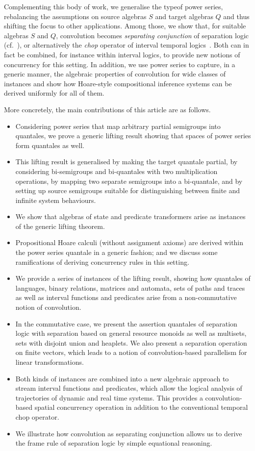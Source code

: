 \documentclass[12pt]{article}
\theoremstyle{definition}
\begin{document}
Complementing this body of work, we generalise the typeof power
series, rebalancing the assumptions on source algebras $S$ and target
algebras $Q$ and thus shifting the focus to other applications.  Among
those, we show that, for suitable algebras $S$ and $Q$, convolution
becomes \emph{separating conjunction} of separation logic
(cf.~\cite{COY07}), or alternatively the \emph{chop} operator of
interval temporal logics~\cite{Mos00}. Both can in fact be combined,
for instance within interval logics, to provide new notions of
concurrency for this setting. In addition, we use power series to
capture, in a generic manner, the algebraic properties of convolution
for wide classes of instances and show how Hoare-style compositional
inference systems can be derived uniformly for all of them.

More concretely, the main contributions of this article are as
follows.
\begin{itemize}
\item Considering power series that map arbitrary partial semigroups
  into quantales, we prove a generic lifting result showing that
  spaces of power series form quantales as well.
\item This lifting result is generalised by making the target quantale
  partial, by considering bi-semigroups and bi-quantales with two
  multiplication operations, by mapping two separate semigroups into a
  bi-quantale, and by setting up source semigroups suitable for
  distinguishing between finite and infinite system behaviours.
\item We show that algebras of state and predicate transformers arise
  as instances of the generic lifting theorem.
\item Propositional Hoare calculi (without assignment axioms) are
  derived within the power series quantale in a generic fashion; and
  we discuss some ramifications of deriving concurrency rules in this
  setting.
\item We provide a series of instances of the lifting result, showing
  how quantales of languages, binary relations, matrices and automata,
  sets of paths and traces as well as interval functions and
  predicates arise from a non-commutative notion of convolution.
\item In the commutative case, we present the assertion quantales of
  separation logic with separation based on general resource monoids
  as well as multisets, sets with disjoint union and heaplets. We also
  present a separation operation on finite vectors, which leads to a
  notion of convolution-based parallelism for linear transformations.
\item Both kinds of instances are combined into a new algebraic
  approach to stream interval functions and predicates, which allow
  the logical analysis of trajectories of dynamic and real time
  systems. This provides a convolution-based spatial concurrency
  operation in addition to the conventional temporal chop operator.
\item We illustrate how convolution as separating conjunction allows
  us to derive the frame rule of separation logic by simple equational
  reasoning.
\end{itemize}
\end{document}
